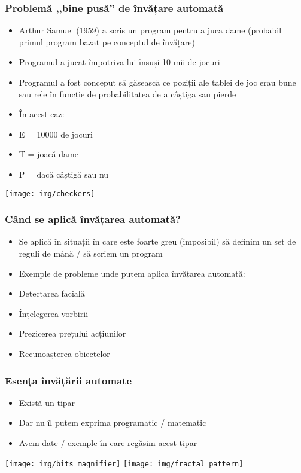 \documentclass{beamer}
\newcommand*{\utb}{\item[{\texttt{[image: img/UTSymbols-Bullet.png]}}]}
\begin{document}
\begin{frame}
    \frametitle{Problemă ,,bine pusă'' de învățare automată}
    \begin{itemize}
        \utb Arthur Samuel (1959) a scris un program pentru a juca dame (probabil primul program bazat pe conceptul de învățare)
        \utb Programul a jucat împotriva lui însuși 10 mii de jocuri
        \utb Programul a fost conceput să găsească ce poziții ale tablei de joc erau bune sau rele în funcție de probabilitatea de a câștiga sau pierde
    \end{itemize}
    \begin{minipage}[b]{0.5\textwidth}
        \begin{itemize}
            \utb În acest caz:
            \utb E = 10000 de jocuri
            \utb T = joacă dame
            \utb P = dacă câștigă sau nu
        \end{itemize}
    \end{minipage}
    \begin{minipage}[b]{0.4\textwidth}
        \texttt{[image: img/checkers]}
    \end{minipage}
\end{frame}

\begin{frame}
    \frametitle{Când se aplică învățarea automată?}
    \begin{itemize}
        \utb Se aplică în situații în care este foarte greu (imposibil) să definim un set de reguli de mână / să scriem un program
        \utb Exemple de probleme unde putem aplica învățarea automată:
        \utb Detectarea facială
        \utb Înțelegerea vorbirii
        \utb Prezicerea prețului acțiunilor
        \utb Recunoașterea obiectelor
    \end{itemize} 
\end{frame}  

\begin{frame}
    \frametitle{Esența învățării automate}
    \begin{itemize}
        \utb Există un tipar
        \utb Dar nu îl putem exprima programatic / matematic
        \utb Avem date / exemple în care regăsim acest tipar
    \end{itemize}
    \begin{center}
    \texttt{[image: img/bits\_magnifier]}
    \texttt{[image: img/fractal\_pattern]}
    \end{center}
\end{frame}
\end{document}
